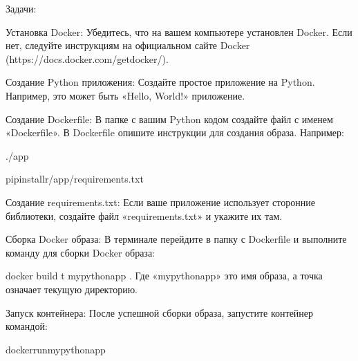 \documentclass[letterpaper,10pt,russian]{sphinxmanual}
\begin{document}
\sphinxAtStartPar
Задачи:

\sphinxAtStartPar
Установка Docker: Убедитесь, что на вашем компьютере установлен Docker. Если нет, следуйте инструкциям на официальном сайте Docker (https://docs.docker.com/get\sphinxhyphen{}docker/).

\sphinxAtStartPar
Создание Python приложения: Создайте простое приложение на Python. Например, это может быть «Hello, World!» приложение.

\sphinxAtStartPar
Создание Dockerfile: В папке с вашим Python кодом создайте файл с именем «Dockerfile». В Dockerfile опишите инструкции для создания образа. Например:

\begin{sphinxVerbatim}[commandchars=\\\{\}]

./app

pipinstall\PYGZhy{}r/app/requirements.txt


\PYG{p}{[}\PYG{p}{]}
\end{sphinxVerbatim}

\sphinxAtStartPar
Создание requirements.txt: Если ваше приложение использует сторонние библиотеки, создайте файл «requirements.txt» и укажите их там.

\sphinxAtStartPar
Сборка Docker образа: В терминале перейдите в папку с Dockerfile и выполните команду для сборки Docker образа:

\sphinxAtStartPar
docker build \sphinxhyphen{}t my\sphinxhyphen{}python\sphinxhyphen{}app .
Где «my\sphinxhyphen{}python\sphinxhyphen{}app» \sphinxhyphen{} это имя образа, а точка означает текущую директорию.

\sphinxAtStartPar
Запуск контейнера: После успешной сборки образа, запустите контейнер командой:

\begin{sphinxVerbatim}[commandchars=\\\{\}]
dockerrunmy\PYGZhy{}python\PYGZhy{}app
\end{sphinxVerbatim}
\end{document}
